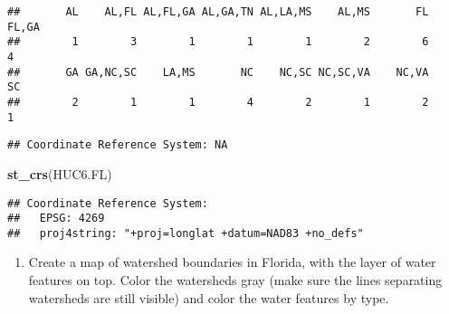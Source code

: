 \documentclass[]{article}
\newenvironment{Shaded}{\begin{snugshade}}{\end{snugshade}}
\newcommand{\KeywordTok}[1]{\textcolor[rgb]{0.13,0.29,0.53}{\textbf{#1}}}
\newcommand{\NormalTok}[1]{#1}
\newcommand{\OperatorTok}[1]{\textcolor[rgb]{0.81,0.36,0.00}{\textbf{#1}}}
\newcommand{\StringTok}[1]{\textcolor[rgb]{0.31,0.60,0.02}{#1}}
\providecommand{\tightlist}{%
  \setlength{\itemsep}{0pt}\setlength{\parskip}{0pt}}
\begin{document}
\begin{Shaded}
\end{Shaded}

\begin{verbatim}
##       AL    AL,FL AL,FL,GA AL,GA,TN AL,LA,MS    AL,MS       FL    FL,GA 
##        1        3        1        1        1        2        6        4 
##       GA GA,NC,SC    LA,MS       NC    NC,SC NC,SC,VA    NC,VA       SC 
##        2        1        1        4        2        1        2        1
\end{verbatim}

\begin{Shaded}
\end{Shaded}

\begin{verbatim}
## Coordinate Reference System: NA
\end{verbatim}

\begin{Shaded}
\begin{Highlighting}[]
\KeywordTok{st_crs}\NormalTok{(HUC6.FL)}
\end{Highlighting}
\end{Shaded}

\begin{verbatim}
## Coordinate Reference System:
##   EPSG: 4269 
##   proj4string: "+proj=longlat +datum=NAD83 +no_defs"
\end{verbatim}

\begin{enumerate}
\def\labelenumi{\arabic{enumi}.}
\setcounter{enumi}{10}
\tightlist
\item
  Create a map of watershed boundaries in Florida, with the layer of
  water features on top. Color the watersheds gray (make sure the lines
  separating watersheds are still visible) and color the water features
  by type.
\end{enumerate}
\end{document}
